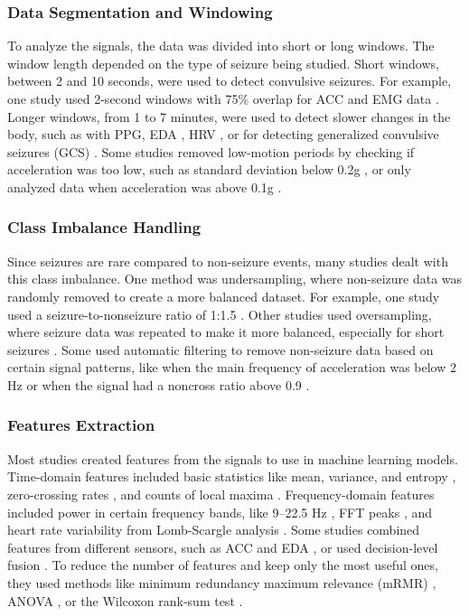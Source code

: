 \subsubsection{Data Segmentation and Windowing}
To analyze the signals, the data was divided into short or long windows. The window length depended on the type of seizure being studied. Short windows, between 2 and 10 seconds, were used to detect convulsive seizures. For example, one study used 2-second windows with 75\% overlap for ACC and EMG data \cite{Milosevic2016-ee,De_Cooman2018-pq,Poh2012-af}. Longer windows, from 1 to 7 minutes, were used to detect slower changes in the body, such as with PPG, EDA \cite{Ramirez-Peralta2021-nq}, HRV \cite{Jiang2022-zu}, or for detecting generalized convulsive seizures (GCS) \cite{Vakilna2024-hk}. Some studies removed low-motion periods by checking if acceleration was too low, such as standard deviation below 0.2g \cite{Wang2022-lt,Dong2022-oo}, or only analyzed data when acceleration was above 0.1g \cite{Larsen2024-vn}.

\subsubsection{Class Imbalance Handling}
Since seizures are rare compared to non-seizure events, many studies dealt with this class imbalance. One method was undersampling, where non-seizure data was randomly removed to create a more balanced dataset. For example, one study used a seizure-to-nonseizure ratio of 1:1.5 \cite{Yu2023-ss,Tang2021-td}. Other studies used oversampling, where seizure data was repeated to make it more balanced, especially for short seizures \cite{Larsen2024-vn}. Some used automatic filtering to remove non-seizure data based on certain signal patterns, like when the main frequency of acceleration was below 2 Hz or when the signal had a noncross ratio above 0.9 \cite{Wang2022-lt}.

\subsubsection{Features Extraction}
Most studies created features from the signals to use in machine learning models. Time-domain features included basic statistics like mean, variance, and entropy \cite{Wang2022-lt,Dong2022-oo}, zero-crossing rates \cite{De_Cooman2018-pq}, and counts of local maxima \cite{Milosevic2016-ee}. Frequency-domain features included power in certain frequency bands, like 9–22.5 Hz \cite{Milosevic2016-ee}, FFT peaks \cite{Wang2022-lt}, and heart rate variability from Lomb-Scargle analysis \cite{Ramirez-Peralta2021-nq}. Some studies combined features from different sensors, such as ACC and EDA \cite{Regalia2019-ch,Wu2024-yl}, or used decision-level fusion \cite{Chowdhury2022-bi}. To reduce the number of features and keep only the most useful ones, they used methods like minimum redundancy maximum relevance (mRMR) \cite{Wang2022-lt,Ge2023-ab}, ANOVA \cite{Dong2022-oo}, or the Wilcoxon rank-sum test \cite{Vakilna2024-hk}.

